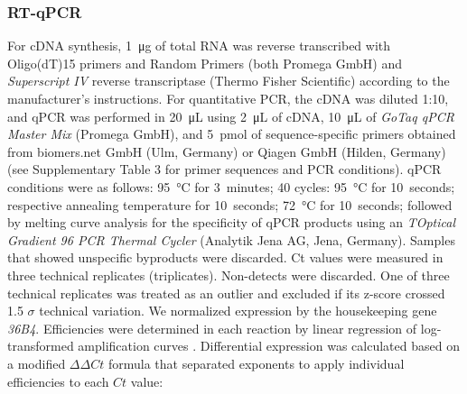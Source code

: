 \subsubsection*{RT-qPCR}
For cDNA synthesis, \SI{1}{\micro\gram} of total RNA was reverse transcribed
with Oligo(dT)15 primers and Random Primers (both Promega GmbH) and
\textit{Superscript IV} reverse transcriptase (Thermo Fisher
Scientific) according to the manufacturer’s instructions. For quantitative PCR,
the cDNA was diluted 1:10, and qPCR was performed in \SI{20}{\micro\liter} using
\SI{2}{\micro\liter} of cDNA, \SI{10}{\micro\liter} of \textit{GoTaq qPCR Master
    Mix} (Promega GmbH), and \SI{5}{pmol} of sequence-specific primers
obtained from biomers.net GmbH (Ulm, Germany) or Qiagen GmbH
(Hilden, Germany) (see Supplementary Table 3 for primer sequences and PCR
conditions). qPCR conditions were as follows: \SI{95}{\degreeCelsius} for
\SI{3}{minutes}; 40 cycles: \SI{95}{\degreeCelsius} for \SI{10}{seconds};
respective annealing temperature for \SI{10}{seconds}; \SI{72}{\degreeCelsius}
for \SI{10}{seconds}; followed by melting curve analysis for the specificity of
qPCR products using an \textit{TOptical Gradient 96 PCR Thermal Cycler}
(Analytik Jena AG, Jena, Germany). Samples that showed unspecific
byproducts were discarded. Ct values were measured in three technical replicates
(triplicates). Non-detects were discarded. One of three technical replicates was
treated as an outlier and excluded if its z-score crossed 1.5 $\sigma$
technical variation. We normalized expression by the housekeeping gene \textit{36B4}.
Efficiencies were determined in each reaction by linear regression of
log-transformed amplification curves
\cite{ramakersAssumptionfreeAnalysisQuantitative2003}. Differential expression
was calculated based on a modified $\Delta\Delta Ct$ formula that separated
exponents to apply individual efficiencies to each $Ct$ value:



